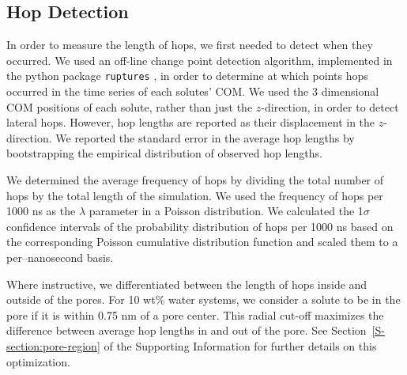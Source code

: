 \documentclass[journal=jpcbfk,manuscript=article]{achemso}
\begin{document}

  \subsection{Hop Detection}\label{method:hop_detection}
  
  In order to measure the length of hops, we first needed to detect
  when they occurred. We used an off-line change point detection 
  algorithm, implemented in the python package \texttt{ruptures}
  \cite{truong_ruptures:_2018}, in order to determine at which 
  points hops occurred in the time series of each solutes' COM. We
  used the 3 dimensional COM positions of each solute, rather than
  just the $z$-direction, in order to detect lateral hops. However,
  hop lengths are reported as their displacement in the $z$-direction.
  We reported the standard error in the average hop lengths by 
  bootstrapping the empirical distribution of observed
  hop lengths.\cite{efron_introduction_1994}

  We determined the average frequency of hops by dividing the total number of 
  hops by the total length of the simulation. We used the frequency of
  hops per 1000 ns as the $\lambda$ parameter in a Poisson distribution.
  We calculated the 1$\sigma$ confidence intervals of the probability %
  distribution of hops per 1000 ns based on the corresponding Poisson 
  cumulative distribution function and scaled them to a per--nanosecond basis. 
 
  
  Where instructive, we differentiated between the length of hops inside
  and outside of the pores. For 10 wt\% water systems, we consider a solute
  to be in the pore if it is within 0.75 nm of a pore center. This radial
  cut-off maximizes the difference between average hop lengths in and out
  of the pore. See Section~\ref{S-section:pore-region} of the Supporting
  Information for further details on this optimization.
  
\end{document}
